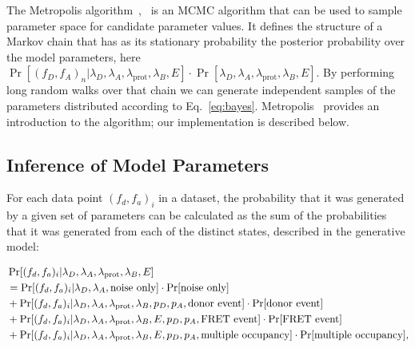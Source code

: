 The Metropolis algorithm~\cite{metropolis53},~\cite{hastings70} is an MCMC algorithm that can be used to sample parameter space for candidate parameter values. It defines the structure of a Markov chain that has as its stationary probability the posterior probability over the model parameters, here $\Pr[(f_D, f_A)_n |\lambda_D, \lambda_A, \lambda_{\text{prot}}, \lambda_B, E] \cdot \Pr[\lambda_D, \lambda_A, \lambda_{\text{prot}}, \lambda_B, E]$. By performing long random walks over that chain we can generate independent samples of the parameters distributed according to Eq.~\ref{eq:bayes}. Metropolis~\cite{chib95} provides an introduction to the algorithm; our implementation is described below.


\subsection*{Inference of Model Parameters}
For each data point $(f_d, f_a)_i$ in a dataset, the probability that it was generated by a given set of parameters can be calculated as the sum of the probabilities that it was generated from each of the distinct states, described in the generative model:

\begin{equation}
\begin{aligned}
\footnotesize
&\Pr[(f_d, f_a)_i|\lambda_D, \lambda_A, \lambda_{\text{prot}}, \lambda_B, E] \\ 
&= \Pr[(f_d, f_a)_i|\lambda_D, \lambda_A, \text{noise only}] \cdot \Pr[\text{noise only}] \\
&+ \Pr[(f_d, f_a)_i|\lambda_D, \lambda_A, \lambda_{\text{prot}}, \lambda_B, p_D, p_A, \text{donor event}] \cdot \Pr[\text{donor event}]\\ 
&+ \Pr[(f_d, f_a)_i|\lambda_D, \lambda_A, \lambda_{\text{prot}}, \lambda_B, E, p_D, p_A, \text{FRET event}] \cdot \Pr[\text{FRET event}] \\
&+ \Pr[(f_d, f_a)_i|\lambda_D, \lambda_A, \lambda_{\text{prot}}, \lambda_B, E, p_D, p_A, \text{multiple occupancy}] \cdot \Pr[\text{multiple occupancy}], \\
\label{eq:multi_sum}
\end{aligned}
\end{equation}


